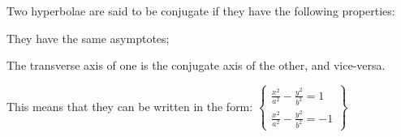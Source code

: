 Two hyperbolae are said to be conjugate if they have the following properties:
\par
They have the same asymptotes;
\par
The transverse axis of one is the conjugate axis of the other, and vice-versa.
\par
This means that they can be written in the form:
$ \left \{ 
\begin{array}{c} 
  \frac{x^2}{a^2}- \frac{y^2}{b^2}=1 \\
  \frac{x^2}{a^2}- \frac{y^2}{b^2}=-1
\end{array} 
\right \}$